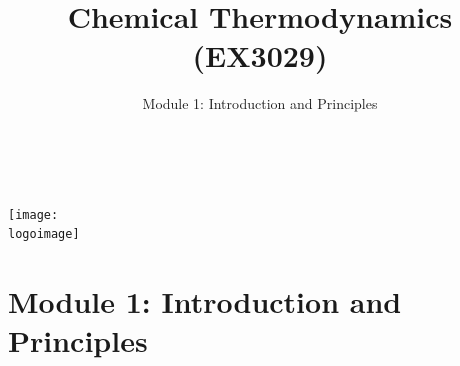 \documentclass[10pt,compress]{beamer}
\institute{School of Engineering}
\title{Chemical Thermodynamics (EX3029)}
\subtitle{Module 1: Introduction and Principles}
\date[ ]{ }
\author[\shortname]{%
  \fullname\\\ttfamily{\emailaddress}
}
\newcommand{\logoimage}{../../FigBanner/UoAHorizBanner}
\begin{document}
\begin{frame}
  \titlepage
  \vfill%
  \begin{center}
    \texttt{[image: \\logoimage]}
  \end{center}
\end{frame}




\section{Module 1: Introduction and Principles} 


\end{document}
